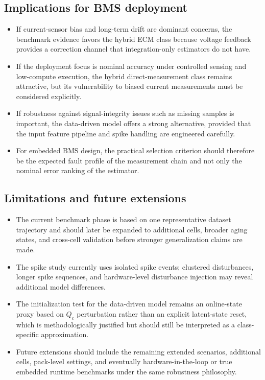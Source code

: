 \documentclass[review,nopreprintline]{elsarticle}
\begin{document}
\subsection{Implications for BMS deployment}
\begin{itemize}[leftmargin=*]
    \item If current-sensor bias and long-term drift are dominant concerns, the benchmark evidence favors the hybrid ECM class because voltage feedback provides a correction channel that integration-only estimators do not have.
    \item If the deployment focus is nominal accuracy under controlled sensing and low-compute execution, the hybrid direct-measurement class remains attractive, but its vulnerability to biased current measurements must be considered explicitly.
    \item If robustness against signal-integrity issues such as missing samples is important, the data-driven model offers a strong alternative, provided that the input feature pipeline and spike handling are engineered carefully.
    \item For embedded BMS design, the practical selection criterion should therefore be the expected fault profile of the measurement chain and not only the nominal error ranking of the estimator.
\end{itemize}

\subsection{Limitations and future extensions}
\begin{itemize}[leftmargin=*]
    \item The current benchmark phase is based on one representative dataset trajectory and should later be expanded to additional cells, broader aging states, and cross-cell validation before stronger generalization claims are made.
    \item The spike study currently uses isolated spike events; clustered disturbances, longer spike sequences, and hardware-level disturbance injection may reveal additional model differences.
    \item The initialization test for the data-driven model remains an online-state proxy based on $Q_c$ perturbation rather than an explicit latent-state reset, which is methodologically justified but should still be interpreted as a class-specific approximation.
    \item Future extensions should include the remaining extended scenarios, additional cells, pack-level settings, and eventually hardware-in-the-loop or true embedded runtime benchmarks under the same robustness philosophy.
\end{itemize}
\end{document}

